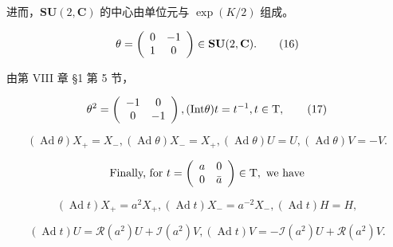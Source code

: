 进而，\(\mathbf{SU}(2,\mathbf{C})\) 的中心由单位元与 \(\exp (K / 2)\) 组成。

\[
\theta = \left( \begin{array}{c c} 0 & - 1 \\ 1 & 0 \end{array} \right) \in \mathbf {S U} (2, \mathbf {C}).\tag{16}
\]

由第 VIII 章 §1 第 5 节，

\[
\theta^ {2} = \left( \begin{array}{c c} - 1 & 0 \\ 0 & - 1 \end{array} \right), (\text {Int}   \theta) t = t ^ {- 1}, t \in \text {T},\tag{17}
\]

\[
(\operatorname{Ad} \theta) X _ {+} = X _ {-}, (\operatorname{Ad} \theta) X _ {-} = X _ {+}, (\operatorname{Ad} \theta) U = U, (\operatorname{Ad} \theta) V = - V.\tag{18}
\]

\[
\text {   Finally,   for   } t = \left( \begin{array}{c c} a & 0 \\ 0 & \bar {a} \end{array} \right) \in \mathrm{T}, \text {   we   have   }
\]

\[
(\operatorname{Ad} t) X _ {+} = a ^ {2} X _ {+}, (\operatorname{Ad} t) X _ {-} = a ^ {- 2} X _ {-}, (\operatorname{Ad} t) H = H,\tag{19}
\]

\[
(\operatorname{Ad} t) U = \mathcal {R} (a ^ {2}) U + \mathcal {I} (a ^ {2}) V, (\operatorname{Ad} t) V = - \mathcal {I} (a ^ {2}) U + \mathcal {R} (a ^ {2}) V.\tag{20}
\]

